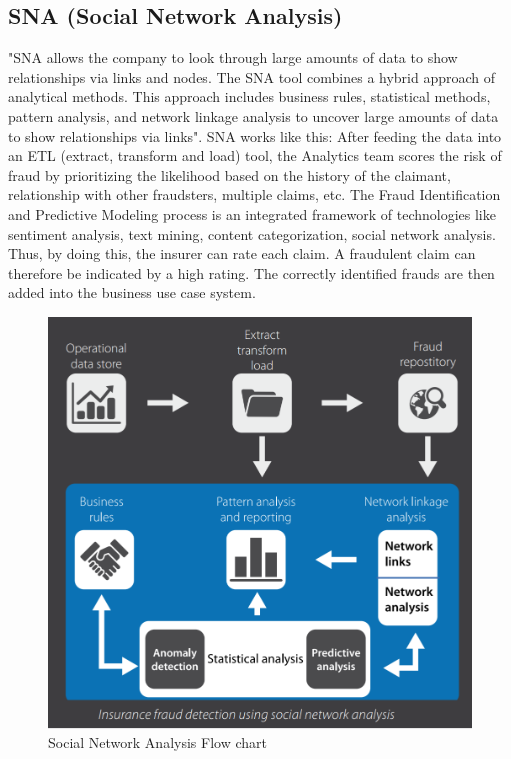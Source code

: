 \documentclass[sigconf]{acmart}
\begin{document}
\subsection{SNA (Social Network Analysis)}
"SNA allows the company to look through large amounts of data to show relationships via links and nodes. The SNA tool combines a hybrid approach of analytical methods. This approach includes business rules, statistical methods, pattern analysis, and network linkage analysis to uncover large amounts of data to show relationships via links". 
SNA works like this: After feeding the data into an ETL (extract, transform and load) tool, the Analytics team scores the risk of fraud by prioritizing the likelihood based on the history of the claimant, relationship with other fraudsters, multiple claims, etc. The Fraud Identification and Predictive Modeling process is an integrated framework of technologies like sentiment analysis, text mining, content categorization, social network analysis. Thus, by doing this, the insurer can rate each claim. A fraudulent claim can therefore be indicated by a high rating. The correctly identified frauds are then added into the business use case system\cite{link7}.
\begin{figure}
  \includegraphics[width=\linewidth]{images/SNA_image1.png}
  \caption{Social Network Analysis Flow chart}
  \label{Figure 1:Social Network Analysis flowchart}
\end{figure}
\end{document}
